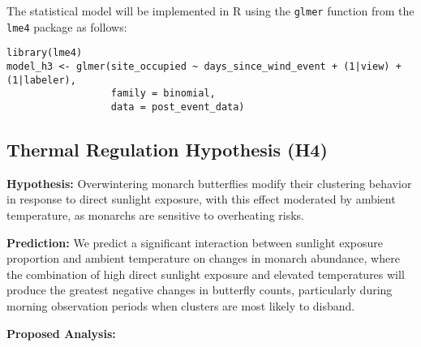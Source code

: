 The statistical model will be implemented in R using the \texttt{glmer} function from the \texttt{lme4} package as follows:

\begin{verbatim}
library(lme4)
model_h3 <- glmer(site_occupied ~ days_since_wind_event + (1|view) + (1|labeler),
                  family = binomial,
                  data = post_event_data)
\end{verbatim}

\subsection{Thermal Regulation Hypothesis (H4)}

\textbf{Hypothesis:} Overwintering monarch butterflies modify their clustering behavior in response to direct sunlight exposure, with this effect moderated by ambient temperature, as monarchs are sensitive to overheating risks.

\textbf{Prediction:} We predict a significant interaction between sunlight exposure proportion and ambient temperature on changes in monarch abundance, where the combination of high direct sunlight exposure and elevated temperatures will produce the greatest negative changes in butterfly counts, particularly during morning observation periods when clusters are most likely to disband.

\textbf{Proposed Analysis:}
